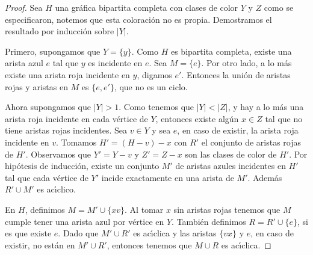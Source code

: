 \begin{proof}
    Sea $H$ una gr\'afica bipartita completa con clases de color $Y$ y $Z$ como
    se especificaron, notemos que esta coloraci\'on no es propia. Demostramos el
    resultado por inducci\'on sobre $|Y|$. 

    Primero, supongamos que $Y=\{y\}$. Como $H$ es bipartita completa, existe
    una arista azul $e$ tal que $y$ es incidente en $e$.   Sea $M = \{ e \}$.
    Por otro lado, a lo m\'as existe una arista roja incidente en $y$, digamos
    $e'$. Entonces la uni\'on de aristas rojas y aristas en $M$ es $\{e, e'\}$,
    que no es un ciclo.

    Ahora supongamos que $|Y|>1$. Como tenemos que $|Y|<|Z|$, y hay a lo m\'as
    una arista roja incidente en cada v\'ertice de $Y$, entonces existe alg\'un
    $x \in Z$ tal que no tiene aristas rojas incidentes. Sea $v \in Y$ y sea
    $e$, en caso de existir, la arista roja incidente en $v$. Tomamos $H'=
    (H-v)-x$ con $R'$ el conjunto de aristas rojas de $H'$. Observamos que $Y' =
    Y- v$ y $Z'= Z- x$ son las clases de color de $H'$. Por hip\'otesis de
    inducci\'on, existe un conjunto $M'$ de aristas azules incidentes en $H'$
    tal que cada v\'ertice de $Y'$ incide exactamente en una arista de $M'$.
    Adem\'as $R'\cup M'$ es ac\'\i{}clico.
    
    En $H$, definimos $M = M'\cup \{xv\}$. Al tomar $x$ sin aristas rojas
    tenemos que $M$ cumple tener una arista azul por v\'ertice en $Y$. Tambi\'en
    definimos $R= R'\cup \{ e \}$, si es que existe $e$.  Dado que  $M'\cup R'$
    es ac\'\i{}clica y las aristas $\{vx\}$ y $e$, en caso de existir, no
    est\'an en $M'\cup R'$, entonces tenemos que $M \cup R$ es ac\'\i{}clica.
\end{proof}

